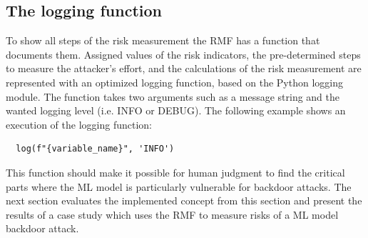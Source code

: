 \subsection{The logging function}

To show all steps of the risk measurement the RMF has a function that documents them. Assigned values of the risk indicators, the pre-determined steps to measure the attacker's effort, and the calculations of the risk measurement are represented with an optimized logging function, based on the Python logging module. The function takes two arguments such as a message string and the wanted logging level (i.e. INFO or DEBUG). The following example shows an execution of the logging function:

\begin{lstlisting}
  log(f"{variable_name}", 'INFO')
\end{lstlisting}

This function should make it possible for human judgment to find the critical parts where the ML model is particularly vulnerable for backdoor attacks. The next section evaluates the implemented concept from this section and present the results of a case study which uses the RMF to measure risks of a ML model backdoor attack.

